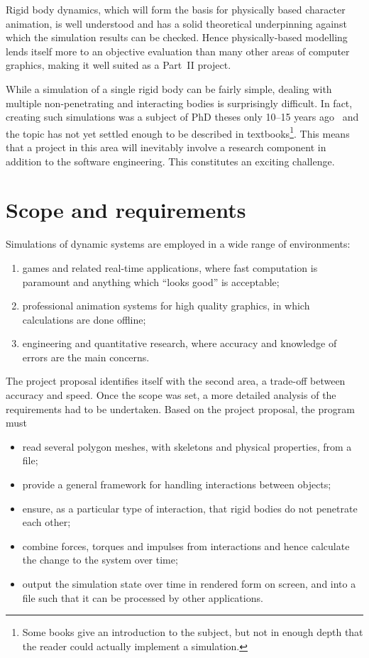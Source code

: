 Rigid body dynamics, which will form the basis for physically based character animation, is well
understood and has a solid theoretical underpinning against which the simulation results can be
checked. Hence physically-based modelling lends itself more to an objective evaluation than
many other areas of computer graphics, making it well suited as a Part~II project.

While a simulation of a single rigid body can be fairly simple, dealing with multiple
non-penetrating and interacting bodies is surprisingly difficult. In fact, creating such
simulations was a subject of PhD theses only 10--15 years
ago~\cite{Baraff:PhD,Mirtich:PhD,Saunders:PhD} and the topic has not yet settled enough to be
described in textbooks\footnote{Some books \cite{Shabana:01,Eberly:04} give an introduction to
the subject, but not in enough depth that the reader could actually implement a simulation.}. This
means that a project in this area will inevitably involve a research component in addition to
the software engineering. This constitutes an exciting challenge.

\section{Scope and requirements}

Simulations of dynamic systems are employed in a wide range of environments:
\begin{enumerate}
\item games and related real-time applications, where fast computation is pa\-ra\-mount and
    anything which ``looks good'' is acceptable;
\item professional animation systems for high quality graphics, in which calculations are done
    offline;
\item engineering and quantitative research, where accuracy and knowledge of errors are the main
    concerns.
\end{enumerate}

The project proposal identifies itself with the second area, a trade-off between accuracy and
speed. Once the scope was set, a more detailed analysis of the requirements had to be undertaken.
Based on the project proposal, the program must
\begin{itemize}
\item read several polygon meshes, with skeletons and physical properties, from a file;
\item provide a general framework for handling interactions between objects;
\item ensure, as a particular type of interaction, that rigid bodies do not penetrate each other;
\item combine forces, torques and impulses from interactions and hence calculate the change to
    the system over time;
\item output the simulation state over time in rendered form on screen, and into a file such that
    it can be processed by other applications.
\end{itemize}

